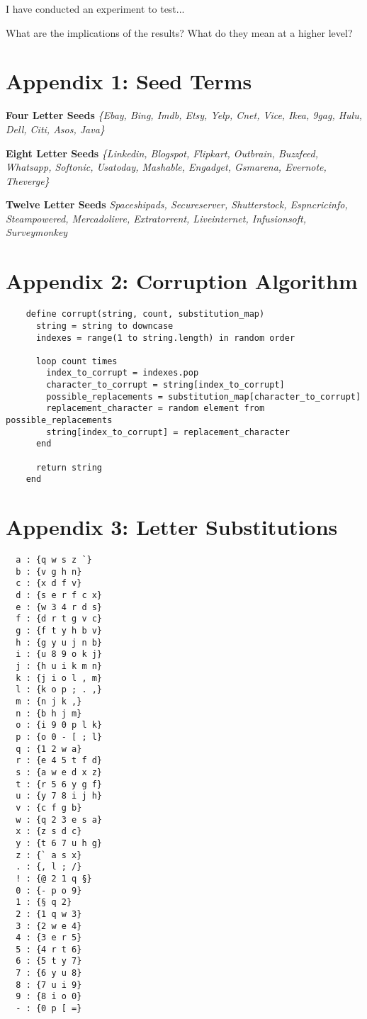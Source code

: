 \documentclass{csfourzero}
\begin{document}
I have conducted an experiment to test...

What are the implications of the results? What do they mean at a higher level?

\raggedbottom


\pagebreak
\raggedbottom
\section{Appendix 1: Seed Terms}
\textbf{Four Letter Seeds}
\textit{\{Ebay, Bing, Imdb, Etsy, Yelp, Cnet, Vice, Ikea, 9gag, Hulu, Dell, Citi, Asos, Java\}}

\noindent
\textbf{Eight Letter Seeds}
\textit{\{Linkedin, Blogspot, Flipkart, Outbrain, Buzzfeed, Whatsapp, Softonic, Usatoday, Mashable, Engadget, Gsmarena, Evernote, Theverge\}}

\noindent
\textbf{Twelve Letter Seeds}
\textit{{Spaceshipads, Secureserver, Shutterstock, Espncricinfo, Steampowered, Mercadolivre, Extratorrent, Liveinternet, Infusionsoft, Surveymonkey}}

\pagebreak
\raggedbottom
\section{Appendix 2: Corruption Algorithm}
  \begin{verbatim}
    define corrupt(string, count, substitution_map)
      string = string to downcase
      indexes = range(1 to string.length) in random order

      loop count times
        index_to_corrupt = indexes.pop
        character_to_corrupt = string[index_to_corrupt]
        possible_replacements = substitution_map[character_to_corrupt]
        replacement_character = random element from possible_replacements
        string[index_to_corrupt] = replacement_character
      end

      return string
    end
  \end{verbatim}

\pagebreak
\section{Appendix 3: Letter Substitutions}
\begin{multicols}{2}
  \begin{verbatim}
  a : {q w s z `}
  b : {v g h n}
  c : {x d f v}
  d : {s e r f c x}
  e : {w 3 4 r d s}
  f : {d r t g v c}
  g : {f t y h b v}
  h : {g y u j n b}
  i : {u 8 9 o k j}
  j : {h u i k m n}
  k : {j i o l , m}
  l : {k o p ; . ,}
  m : {n j k ,}
  n : {b h j m}
  o : {i 9 0 p l k}
  p : {o 0 - [ ; l}
  q : {1 2 w a}
  r : {e 4 5 t f d}
  s : {a w e d x z}
  t : {r 5 6 y g f}
  u : {y 7 8 i j h}
  v : {c f g b}
  w : {q 2 3 e s a}
  x : {z s d c}
  y : {t 6 7 u h g}
  z : {` a s x}
  . : {, l ; /}
  ! : {@ 2 1 q §}
  0 : {- p o 9}
  1 : {§ q 2}
  2 : {1 q w 3}
  3 : {2 w e 4}
  4 : {3 e r 5}
  5 : {4 r t 6}
  6 : {5 t y 7}
  7 : {6 y u 8}
  8 : {7 u i 9}
  9 : {8 i o 0}
  - : {0 p [ =}
  \end{verbatim}
\end{multicols}
\end{document}
